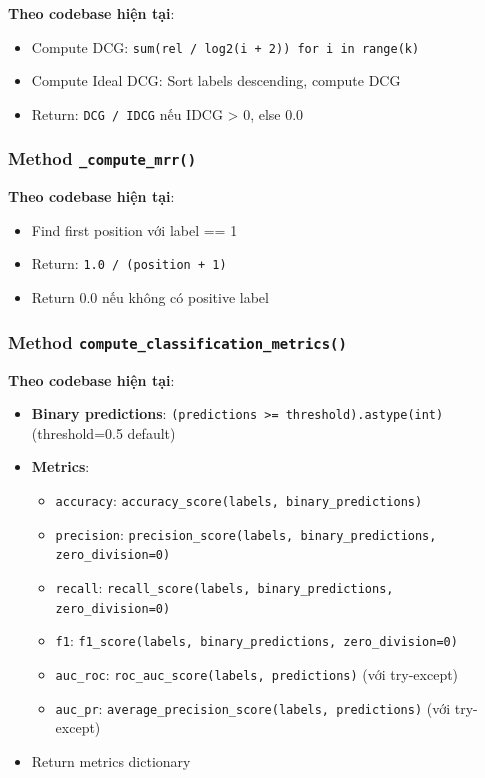 \textbf{Theo codebase hiện tại}:

\begin{itemize}
    \item Compute DCG: \texttt{sum(rel / log2(i + 2)) for i in range(k)}
    \item Compute Ideal DCG: Sort labels descending, compute DCG
    \item Return: \texttt{DCG / IDCG} nếu IDCG > 0, else 0.0
\end{itemize}

\subsubsection{Method \texttt{\_compute\_mrr()}}

\textbf{Theo codebase hiện tại}:

\begin{itemize}
    \item Find first position với label == 1
    \item Return: \texttt{1.0 / (position + 1)}
    \item Return 0.0 nếu không có positive label
\end{itemize}

\subsubsection{Method \texttt{compute\_classification\_metrics()}}

\textbf{Theo codebase hiện tại}:

\begin{itemize}
    \item \textbf{Binary predictions}: \texttt{(predictions >= threshold).astype(int)} (threshold=0.5 default)
    \item \textbf{Metrics}:
    \begin{itemize}
        \item \texttt{accuracy}: \texttt{accuracy\_score(labels, binary\_predictions)}
        \item \texttt{precision}: \texttt{precision\_score(labels, binary\_predictions, zero\_division=0)}
        \item \texttt{recall}: \texttt{recall\_score(labels, binary\_predictions, zero\_division=0)}
        \item \texttt{f1}: \texttt{f1\_score(labels, binary\_predictions, zero\_division=0)}
        \item \texttt{auc\_roc}: \texttt{roc\_auc\_score(labels, predictions)} (với try-except)
        \item \texttt{auc\_pr}: \texttt{average\_precision\_score(labels, predictions)} (với try-except)
    \end{itemize}
    \item Return metrics dictionary
\end{itemize}

